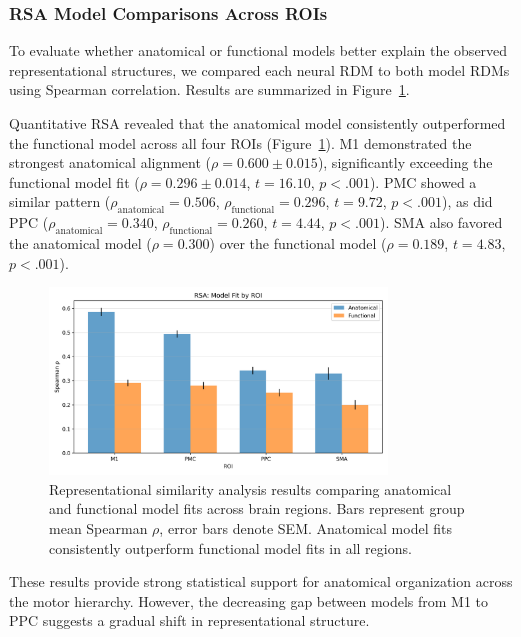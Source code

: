 \documentclass{article}
\begin{document}
\subsubsection{RSA Model Comparisons Across ROIs}
To evaluate whether anatomical or functional models better explain the observed representational structures, we compared each neural RDM to both model RDMs using Spearman correlation. Results are summarized in Figure~\ref{fig:rsa}.

Quantitative RSA revealed that the anatomical model consistently outperformed the functional model across all four ROIs (Figure~\ref{fig:rsa}). M1 demonstrated the strongest anatomical alignment (\(\rho = 0.600 \pm 0.015\)), significantly exceeding the functional model fit (\(\rho = 0.296 \pm 0.014\), \(t = 16.10\), \(p < .001\)). PMC showed a similar pattern (\(\rho_{\text{anatomical}} = 0.506\), \(\rho_{\text{functional}} = 0.296\), \(t = 9.72\), \(p < .001\)), as did PPC (\(\rho_{\text{anatomical}} = 0.340\), \(\rho_{\text{functional}} = 0.260\), \(t = 4.44\), \(p < .001\)). SMA also favored the anatomical model (\(\rho = 0.300\)) over the functional model (\(\rho = 0.189\), \(t = 4.83\), \(p < .001\)).

\begin{figure}[!htbp]
\centering
\includegraphics[width=0.8\textwidth]{results/rsa_model_fit_by_roi.png}
\caption{Representational similarity analysis results comparing anatomical and functional model fits across brain regions. Bars represent group mean Spearman \(\rho\), error bars denote SEM. Anatomical model fits consistently outperform functional model fits in all regions.}
\label{fig:rsa}
\end{figure}

These results provide strong statistical support for anatomical organization across the motor hierarchy. However, the decreasing gap between models from M1 to PPC suggests a gradual shift in representational structure.
\end{document}
